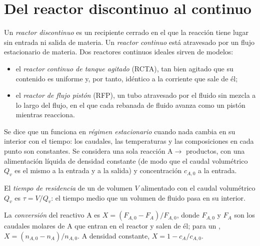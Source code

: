 \section{Del reactor discontinuo al continuo}

\begin{definition}\label{def:b2:continuous-reactors:reactors}
Un \emph{reactor discontinuo} es un recipiente cerrado en el que la
reacción tiene lugar sin entrada ni salida de materia. Un
\emph{reactor continuo} está atravesado por un flujo estacionario
de materia. Dos reactores continuos ideales sirven de modelos:
\begin{itemize}
  \item el \emph{reactor continuo de tanque agitado}
(RCTA), tan bien agitado que su contenido es
        uniforme y, por tanto, idéntico a la corriente que sale de él;
  \item el \emph{reactor de flujo pistón} (RFP), un tubo
        atravesado por el fluido sin mezcla a lo largo del flujo, en el que cada rebanada de
        fluido avanza como un pistón mientras reacciona.
\end{itemize}
\end{definition}

Se dice que un  funciona en \emph{régimen estacionario} cuando
nada cambia en su interior con el tiempo: los caudales, las temperaturas y las
composiciones en cada punto son constantes. Se considera una sola reacción
$\mathrm A \to$ productos, con una alimentación líquida de densidad constante (de modo que el
caudal volumétrico $Q_v$ es el mismo a la entrada y a la salida) y
concentración $c_{A,0}$ a la entrada.

\begin{definition}\label{def:b2:continuous-reactors:residence-time}
El \emph{tiempo de residencia} de un  de
volumen $V$ alimentado con el caudal volumétrico $Q_v$ es $\tau = V/Q_v$: el tiempo
medio que un volumen de fluido pasa en su interior.
\end{definition}

\begin{definition}[Conversión]\label{def:b2:continuous-reactors:conversion}
La \emph{conversión} del reactivo A es $X = (F_{A,0} -
F_A)/F_{A,0}$, donde $F_{A,0}$ y $F_A$ son los caudales molares de A que
entran en el reactor y salen de él; para un , $X = (n_{A,0} -
n_A)/n_{A,0}$. A densidad constante, $X = 1 - c_A/c_{A,0}$.
\end{definition}

